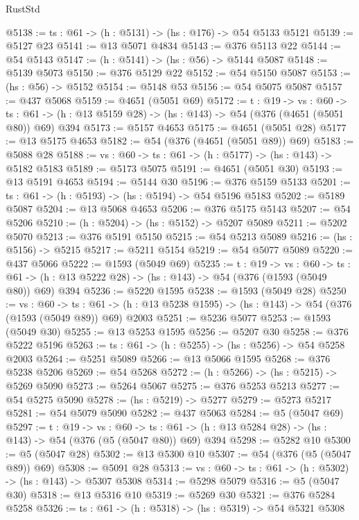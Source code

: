 \begin{lexlean}{RustStd}
\begin{coremodule}
@5138 := {ts : @61} -> (h : @5131) -> (hs : @176) -> @54 @5133 @5121
@5139 := @5127 @23
@5141 := @13 @5071 @4834
@5143 := @376 @5113 @22
@5144 := @54 @5143
@5147 := (h : @5141) -> (hs : @56) -> @5144 @5087
@5148 := @5139 @5073
@5150 := @376 @5129 @22
@5152 := @54 @5150 @5087
@5153 := (hs : @56) -> @5152
@5154 := @5148 @53
@5156 := @54 @5075 @5087
@5157 := @437 @5068
@5159 := @4651 (@5051 @69)
@5172 := {t : @19} ->
  {vs : @60} ->
  {ts : @61} -> (h : @13 @5159 @28) -> (hs : @143) -> @54 (@376 (@4651 (@5051 @80)) @69) @394
@5173 := @5157 @4653
@5175 := @4651 (@5051 @28)
@5177 := @13 @5175 @4653
@5182 := @54 (@376 (@4651 (@5051 @89)) @69)
@5183 := @5088 @28
@5188 := {vs : @60} -> {ts : @61} -> (h : @5177) -> (hs : @143) -> @5182 @5183
@5189 := @5173 @5075
@5191 := @4651 (@5051 @30)
@5193 := @13 @5191 @4653
@5194 := @5144 @30
@5196 := @376 @5159 @5133
@5201 := {ts : @61} -> (h : @5193) -> (hs : @5194) -> @54 @5196 @5183
@5202 := @5189 @5087
@5204 := @13 @5068 @4653
@5206 := @376 @5175 @5143
@5207 := @54 @5206
@5210 := (h : @5204) -> (hs : @5152) -> @5207 @5089
@5211 := @5202 @5070
@5213 := @376 @5191 @5150
@5215 := @54 @5213 @5089
@5216 := (hs : @5156) -> @5215
@5217 := @5211 @5154
@5219 := @54 @5077 @5089
@5220 := @437 @5066
@5222 := @1593 (@5049 @69)
@5235 := {t : @19} ->
  {vs : @60} ->
  {ts : @61} -> (h : @13 @5222 @28) -> (hs : @143) -> @54 (@376 (@1593 (@5049 @80)) @69) @394
@5236 := @5220 @1595
@5238 := @1593 (@5049 @28)
@5250 := {vs : @60} ->
  {ts : @61} -> (h : @13 @5238 @1595) -> (hs : @143) -> @54 (@376 (@1593 (@5049 @89)) @69) @2003
@5251 := @5236 @5077
@5253 := @1593 (@5049 @30)
@5255 := @13 @5253 @1595
@5256 := @5207 @30
@5258 := @376 @5222 @5196
@5263 := {ts : @61} -> (h : @5255) -> (hs : @5256) -> @54 @5258 @2003
@5264 := @5251 @5089
@5266 := @13 @5066 @1595
@5268 := @376 @5238 @5206
@5269 := @54 @5268
@5272 := (h : @5266) -> (hs : @5215) -> @5269 @5090
@5273 := @5264 @5067
@5275 := @376 @5253 @5213
@5277 := @54 @5275 @5090
@5278 := (hs : @5219) -> @5277
@5279 := @5273 @5217
@5281 := @54 @5079 @5090
@5282 := @437 @5063
@5284 := @5 (@5047 @69)
@5297 := {t : @19} ->
  {vs : @60} ->
  {ts : @61} -> (h : @13 @5284 @28) -> (hs : @143) -> @54 (@376 (@5 (@5047 @80)) @69) @394
@5298 := @5282 @10
@5300 := @5 (@5047 @28)
@5302 := @13 @5300 @10
@5307 := @54 (@376 (@5 (@5047 @89)) @69)
@5308 := @5091 @28
@5313 := {vs : @60} -> {ts : @61} -> (h : @5302) -> (hs : @143) -> @5307 @5308
@5314 := @5298 @5079
@5316 := @5 (@5047 @30)
@5318 := @13 @5316 @10
@5319 := @5269 @30
@5321 := @376 @5284 @5258
@5326 := {ts : @61} -> (h : @5318) -> (hs : @5319) -> @54 @5321 @5308

\end{coremodule}
\end{lexlean}
